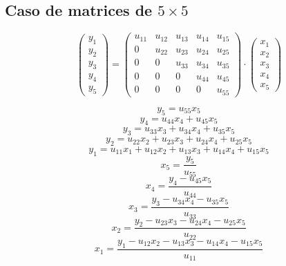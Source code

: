 \documentclass[10pt,a4paper,dvipdfmx]{article}
\begin{document}
\subsection{Caso de matrices de $5\times 5$ }
$$ \left( 
\begin{array}{c}
y_{1} \\
y_{2} \\
y_{3} \\
y_{4} \\
y_{5} 
 \end{array}
\right)
 = \left( 
\begin{array}{ccccc}
u_{{1}{1}} & u_{{1}{2}} & u_{{1}{3}} & u_{{1}{4}} & u_{{1}{5}} \\
0 & u_{{2}{2}} & u_{{2}{3}} & u_{{2}{4}} & u_{{2}{5}} \\
0 & 0 & u_{{3}{3}} & u_{{3}{4}} & u_{{3}{5}} \\
0 & 0 & 0 & u_{{4}{4}} & u_{{4}{5}} \\
0 & 0 & 0 & 0 & u_{{5}{5}} 
 \end{array}
\right)
 \cdot \left( 
\begin{array}{c}
x_{1} \\
x_{2} \\
x_{3} \\
x_{4} \\
x_{5} 
 \end{array}
\right)
 $$
\begin{multicols}{2}
$$ y_{5} = u_{{5}{5}} x_{5} $$
$$ y_{4} = u_{{4}{4}} x_{4} + u_{{4}{5}} x_{5} $$
$$ y_{3} = u_{{3}{3}} x_{3} + u_{{3}{4}} x_{4} + u_{{3}{5}} x_{5} $$
$$ y_{2} = u_{{2}{2}} x_{2} + u_{{2}{3}} x_{3} + u_{{2}{4}} x_{4} + u_{{2}{5}} x_{5} $$
$$ y_{1} = u_{{1}{1}} x_{1} + u_{{1}{2}} x_{2} + u_{{1}{3}} x_{3} + u_{{1}{4}} x_{4} + u_{{1}{5}} x_{5} $$
\vfill\null
\columnbreak
$$ x_{5} = \dfrac{y_{5}}{u_{{5}{5}}} $$
$$ x_{4} = \dfrac{y_{4}- u_{{4}{5}} x_{5}}{u_{{4}{4}}} $$
$$ x_{3} = \dfrac{y_{3}- u_{{3}{4}} x_{4}- u_{{3}{5}} x_{5}}{u_{{3}{3}}} $$
$$ x_{2} = \dfrac{y_{2}- u_{{2}{3}} x_{3}- u_{{2}{4}} x_{4}- u_{{2}{5}} x_{5}}{u_{{2}{2}}} $$
$$ x_{1} = \dfrac{y_{1}- u_{{1}{2}} x_{2}- u_{{1}{3}} x_{3}- u_{{1}{4}} x_{4}- u_{{1}{5}} x_{5}}{u_{{1}{1}}} $$
\end{multicols}
\end{document}
